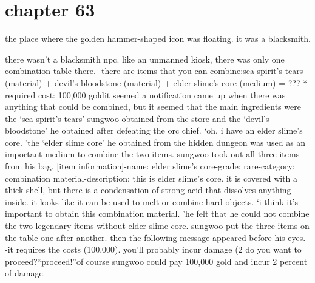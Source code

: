 \section{chapter 63}

                            the place where the golden hammer-shaped icon was floating.
 it was a blacksmith.





there wasn’t a blacksmith npc.
 like an unmanned kiosk, there was only one combination table there.
-there are items that you can combine:sea spirit’s tears (material) + devil’s bloodstone (material) + elder slime’s core (medium) = ??? * required cost: 100,000 goldit seemed a notification came up when there was anything that could be combined, but it seemed that the main ingredients were the ‘sea spirit’s tears’ sungwoo obtained from the store and the ‘devil’s bloodstone’ he obtained after defeating the orc chief.
‘oh, i have an elder slime’s core.
’the ‘elder slime core’ he obtained from the hidden dungeon was used as an important medium to combine the two items.
 sungwoo took out all three items from his bag.
[item information]-name: elder slime’s core-grade: rare-category: combination material-description: this is elder slime’s core.
 it is covered with a thick shell, but there is a condensation of strong acid that dissolves anything inside.
 it looks like it can be used to melt or combine hard objects.
‘i think it’s important to obtain this combination material.
’he felt that he could not combine the two legendary items without elder slime core.
sungwoo put the three items on the table one after another.
then the following message appeared before his eyes.
-it requires the costs (100,000).
 you’ll probably incur damage (2%
 do you want to proceed?“proceed!”of course sungwoo could pay 100,000 gold and incur 2 percent of damage.

